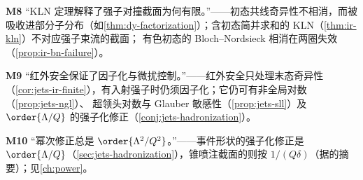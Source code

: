 \begin{tcolorbox}[enhanced,breakable,title=常见误解（M8、M9、M10）,fonttitle=\bfseries,
  colback=gray!3!white,colframe=gray!55!black,boxrule=0.6pt,arc=2pt,
  left=5pt,right=5pt,top=3pt,bottom=3pt,before skip=6pt,after skip=6pt]
\textbf{M8} “KLN 定理解释了强子对撞截面为何有限。”——初态共线奇异性不相消，而被吸收进部分子分布（如\cref{thm:dy-factorization}）；含初态简并求和的 KLN（\cref{thm:ir-kln}）不对应强子束流的截面；
有色初态的 Bloch--Nordsieck 相消在两圈失效（\cref{prop:ir-bn-failure}）。\par
\textbf{M9} “红外安全保证了因子化与微扰控制。”——红外安全只处理末态奇异性（\cref{cor:jets-ir-finite}），有入射强子时仍须因子化；它仍可有非全局对数（\cref{prop:jets-ngl}）、
超领头对数与 Glauber 敏感性（\cref{prop:jets-sll}）及 $\order{\Lambda/Q}$ 的强子化修正（\cref{conj:jets-hadronization}）。\par
\textbf{M10} “幂次修正总是 $\order{\Lambda^2/Q^2}$。”——事件形状的强子化修正是 $\order{\Lambda/Q}$（\cref{sec:jets-hadronization}），锥喷注截面的则按 $1/(Q\delta)$（据\cite{Korchemsky:1994is}的摘要）；见\cref{ch:power}。
\end{tcolorbox}
